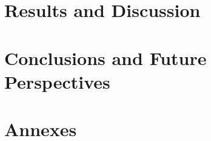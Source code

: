 \documentclass[11pt, a4paper]{report}
\newcommand{\importsection}[1]{}
\begin{document}
\chapter{Results and Discussion}
\importsection{results}
\cleardoublepage

\chapter{Conclusions and Future Perspectives}
\importsection{conclusions}
\cleardoublepage

{\fontsize{9pt}{11pt}\selectfont
\setlength{\bibsep}{0pt}

}
\cleardoublepage

\appendix
\chapter{Annexes}
\importsection{appendix_a}
\cleardoublepage
\importsection{appendix_b}
\cleardoublepage

\importsection{appendix_c}
\cleardoublepage

\importsection{appendix_d}
\cleardoublepage

\importsection{appendix_e}
\cleardoublepage

\importsection{appendix_f}
\cleardoublepage

\importsection{appendix_g}
\cleardoublepage

\importsection{appendix_h}
\cleardoublepage
\end{document}
